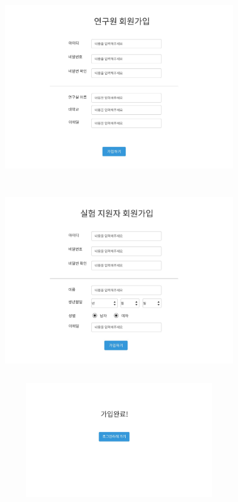 \documentclass[letterpaper, 10 pt, conference]{ieeeconf}  %
\begin{document}
\includegraphics[width=10cm,height=8cm]{Oven/04_labSignup.jpg}
\includegraphics[width=10cm,height = 8cm]{Oven/03_applicantSignup.jpg}
\includegraphics[width=10cm,height = 5cm]{Oven/05_signupCompleted.jpg}
\end{document}
